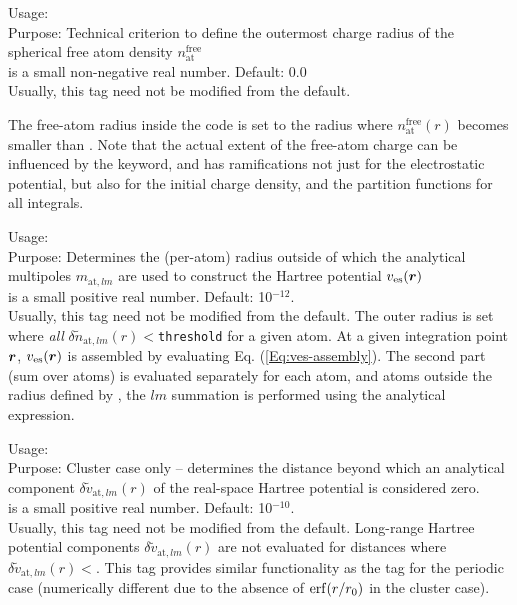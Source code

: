 {
  \noindent
  Usage:  
    \\[1.0ex]
  Purpose: Technical criterion to define the outermost charge radius
    of the spherical free atom density $n_\text{at}^\text{free}$
    \\[1.0ex]
   is a small non-negative real number. Default: 0.0 \\
}
Usually, this tag need not be modified from the default. 

The free-atom radius inside the code is set to the radius where
$n_\text{at}^\text{free}(r)$ becomes smaller than
. Note that the actual extent of the free-atom
charge can be influenced by the  keyword, and
has ramifications not just for the electrostatic potential, but also
for the initial charge density, and the partition functions for all
integrals. 

{
  \noindent
  Usage:  
    \\[1.0ex]
  Purpose: Determines the (per-atom) radius outside of which the
    analytical multipoles $m_{\text{at},lm}$ are used to construct the
    Hartree potential $v_\text{es}(\mbox{\boldmath$r$})$ \\[1.0ex]
   is a small positive real number. Default: 10$^{-12}$.\\
}
Usually, this tag need not be modified from the default. The outer
radius is set where \emph{all}
$\delta\tilde{n}_{\text{at},lm}(r)<$\texttt{threshold} for a given
atom. At a given integration point $\mbox{\boldmath$r$}$, $v_\text{es}(\mbox{\boldmath$r$})$ is
assembled by evaluating Eq. (\ref{Eq:ves-assembly}). The second part
(sum over atoms) is evaluated separately for each atom, and atoms
outside the radius defined by , the
$lm$ summation is performed using the analytical expression.

{
  \noindent
  Usage:   \\[1.0ex]
  Purpose: Cluster case only -- determines the distance beyond which
    an analytical component $\delta\tilde{v}_{\text{at},lm}(r)$ of the
    real-space Hartree potential is considered zero. \\[1.0ex]
   is a small positive real number. Default:
    10$^{-10}$. \\
}
Usually, this tag need not be modified from the default. Long-range
Hartree potential components $\delta\tilde{v}_{\text{at},lm}(r)$ are
  not evaluated for distances where
  $\delta\tilde{v}_{\text{at},lm}(r)<$. This tag
  provides similar functionality as the 
   tag for the periodic case
  (numerically different due to the absence of $\mathop{\mathrm{erf}}(r/r_0)$ in the
  cluster case). 


